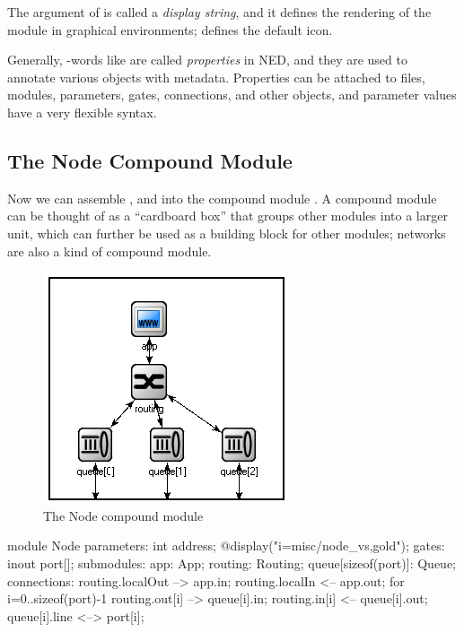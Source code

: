 The argument of  is called a \textit{display string},
and it defines the rendering of the module in graphical environments;
 defines the default icon.

Generally, -words like  are called \textit{properties}
in NED, and they are used to annotate various objects
with metadata. Properties can be attached to files, modules, parameters, gates,
connections, and other objects, and parameter values have a very flexible
syntax.


\subsection{The Node Compound Module}

Now we can assemble ,  and  into the
compound module . A compound module can be thought of as
a ``cardboard box'' that groups other modules into a larger unit,
which can further be used as a building block for other modules;
networks are also a kind of compound module.

\begin{figure}[htbp]
  \centering
  \includegraphics[scale=0.6]{figures/ned-routing-node}
  \caption{The Node compound module}
  \label{fig:ned-routing-node}
\end{figure}

\begin{ned}
module Node
{
    parameters:
        int address;
        @display("i=misc/node_vs,gold");
    gates:
        inout port[];
    submodules:
        app: App;
        routing: Routing;
        queue[sizeof(port)]: Queue;
    connections:
        routing.localOut --> app.in;
        routing.localIn <-- app.out;
        for i=0..sizeof(port)-1 {
            routing.out[i] --> queue[i].in;
            routing.in[i] <-- queue[i].out;
            queue[i].line <--> port[i];
        }
}
\end{ned}


